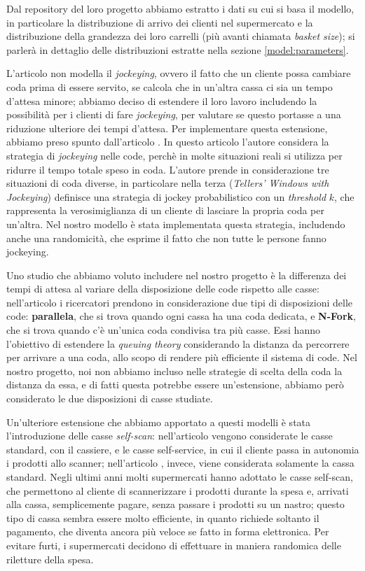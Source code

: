 Dal repository del loro progetto abbiamo estratto i dati su cui si basa il modello, in particolare la distribuzione di arrivo dei clienti nel supermercato e la distribuzione della grandezza dei loro carrelli (più avanti chiamata \textit{basket size}); si parlerà in dettaglio delle distribuzioni estratte nella sezione \ref{model:parameters}.

L'articolo \cite{article1} non modella il \textit{jockeying}, ovvero il fatto che un cliente possa cambiare coda prima di essere servito, se calcola che in un'altra cassa ci sia un tempo d'attesa minore; abbiamo deciso di estendere il loro lavoro includendo la possibilità per i clienti di fare \textit{jockeying}, per valutare se questo portasse a una riduzione ulteriore dei tempi d'attesa. Per implementare questa estensione, abbiamo preso spunto dall'articolo \cite{koenigsberg1966jockeying}.
In questo articolo l'autore considera la strategia di \textit{jockeying} nelle code, perchè in molte situazioni reali si utilizza per ridurre il tempo totale speso in coda. L'autore prende in considerazione tre situazioni di coda diverse, in particolare nella terza (\textit{Tellers' Windows with Jockeying}) definisce una strategia di jockey probabilistico con un \textit{threshold} $k$, che rappresenta la verosimiglianza di un cliente di lasciare la propria coda per un'altra. Nel nostro modello è stata implementata questa strategia, includendo anche una randomicità, che esprime il fatto che non tutte le persone fanno jockeying.

Uno studio che abbiamo voluto includere nel nostro progetto è la differenza dei tempi di attesa al variare della disposizione delle code rispetto alle casse: nell'articolo \cite{yanagisawa2011methods} i ricercatori prendono in considerazione due tipi di disposizioni delle code: \textbf{parallela}, che si trova quando ogni cassa ha una coda dedicata, e \textbf{N-Fork}, che si trova quando c'è un'unica coda condivisa tra più casse. Essi hanno l'obiettivo di estendere la \textit{queuing theory} considerando la distanza da percorrere per arrivare a una coda, allo scopo di rendere più efficiente il sistema di code. Nel nostro progetto, noi non abbiamo incluso nelle strategie di scelta della coda la distanza da essa, e di fatti questa potrebbe essere un'estensione, abbiamo però considerato le due disposizioni di casse studiate. 

Un'ulteriore estensione che abbiamo apportato a questi modelli è stata
l'introduzione delle casse \textit{self-scan}: nell'articolo
\cite{article1} vengono considerate le casse standard, con il
cassiere, e le casse self-service, in cui il cliente passa in
autonomia i prodotti allo scanner; nell'articolo
\cite{yanagisawa2011methods}, invece, viene considerata solamente la
cassa standard. Negli ultimi anni molti supermercati hanno adottato le
casse self-scan, che permettono al cliente di scannerizzare i prodotti
durante la spesa e, arrivati alla cassa, semplicemente pagare, senza
passare i prodotti su un nastro; questo tipo di cassa sembra essere
molto efficiente, in quanto richiede soltanto il pagamento, che
diventa ancora più veloce se fatto in forma elettronica. Per evitare
furti, i supermercati decidono di effettuare in maniera randomica
delle riletture della spesa.

